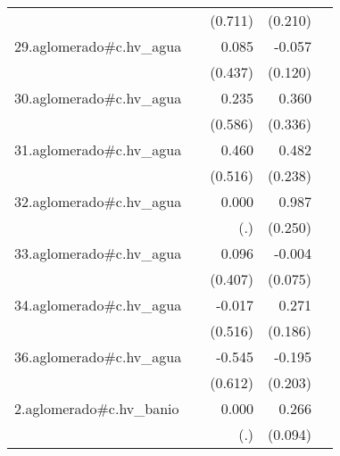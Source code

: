 {\begin{longtable}{l*{4}{D{.}{.}{-1}}}
            &                     &     (0.711)         &     (0.210)         &                     \\
\addlinespace
29.aglomerado#c.hv\_agua&                     &       0.085         &      -0.057         &                     \\
            &                     &     (0.437)         &     (0.120)         &                     \\
\addlinespace
30.aglomerado#c.hv\_agua&                     &       0.235         &       0.360         &                     \\
            &                     &     (0.586)         &     (0.336)         &                     \\
\addlinespace
31.aglomerado#c.hv\_agua&                     &       0.460         &       0.482\sym{*}  &                     \\
            &                     &     (0.516)         &     (0.238)         &                     \\
\addlinespace
32.aglomerado#c.hv\_agua&                     &       0.000         &       0.987\sym{***}&                     \\
            &                     &         (.)         &     (0.250)         &                     \\
\addlinespace
33.aglomerado#c.hv\_agua&                     &       0.096         &      -0.004         &                     \\
            &                     &     (0.407)         &     (0.075)         &                     \\
\addlinespace
34.aglomerado#c.hv\_agua&                     &      -0.017         &       0.271         &                     \\
            &                     &     (0.516)         &     (0.186)         &                     \\
\addlinespace
36.aglomerado#c.hv\_agua&                     &      -0.545         &      -0.195         &                     \\
            &                     &     (0.612)         &     (0.203)         &                     \\
\addlinespace
2.aglomerado#c.hv\_banio&                     &       0.000         &       0.266\sym{**} &                     \\
            &                     &         (.)         &     (0.094)         &                     \\

\end{longtable}}
